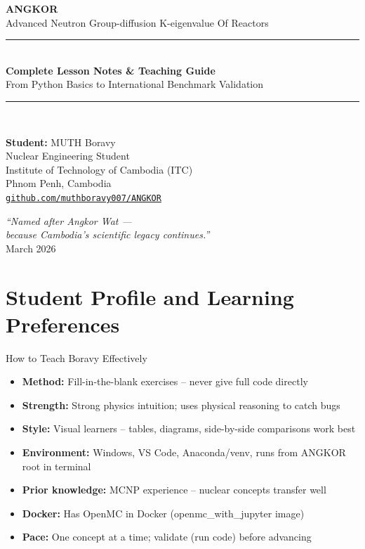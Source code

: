 \documentclass[12pt,a4paper]{article}
\begin{document}
\begin{titlepage}
\centering
\vspace*{1.5cm}
{\Huge\bfseries\color{angkorblue} ANGKOR}\\[0.4cm]
{\Large\color{angkorgold} Advanced Neutron Group-diffusion K-eigenvalue Of Reactors}\\[1cm]
\rule{\linewidth}{0.5mm}\\[0.3cm]
{\LARGE\bfseries Complete Lesson Notes \& Teaching Guide}\\[0.2cm]
{\large From Python Basics to International Benchmark Validation}\\
\rule{\linewidth}{0.5mm}\\[1.5cm]

\begin{minipage}{0.7\textwidth}\centering
{\large\textbf{Student:} MUTH Boravy}\\
Nuclear Engineering Student\\
Institute of Technology of Cambodia (ITC)\\
Phnom Penh, Cambodia\\[0.3cm]
\texttt{\href{https://github.com/muthboravy007/ANGKOR}{github.com/muthboravy007/ANGKOR}}
\end{minipage}

\vfill
{\large\itshape ``Named after Angkor Wat ---\\
because Cambodia's scientific legacy continues.''}\\[1cm]
{\large March 2026}
\end{titlepage}

\tableofcontents
\newpage

\section{Student Profile and Learning Preferences}

\begin{lessonbox}{How to Teach Boravy Effectively}
\begin{itemize}
  \item \textbf{Method:} Fill-in-the-blank exercises -- never give full code directly
  \item \textbf{Strength:} Strong physics intuition; uses physical reasoning to catch bugs
  \item \textbf{Style:} Visual learners -- tables, diagrams, side-by-side comparisons work best
  \item \textbf{Environment:} Windows, VS Code, Anaconda/venv, runs from ANGKOR root in terminal
  \item \textbf{Prior knowledge:} MCNP experience -- nuclear concepts transfer well
  \item \textbf{Docker:} Has OpenMC in Docker (openmc\_with\_jupyter image)
  \item \textbf{Pace:} One concept at a time; validate (run code) before advancing
\end{itemize}
\end{lessonbox}
\end{document}
